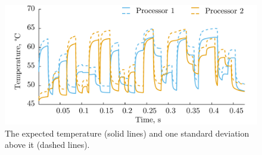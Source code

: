 \begin{figure}[bl]
  \vspace{-1.0em}
  \centering
  \includegraphics[width=1.00\columnwidth]{include/assets/application-temperature.pdf}
  \caption{The expected temperature (solid lines) and one standard deviation above it (dashed lines).}
  \vspace{-1.5em}
\end{figure}
